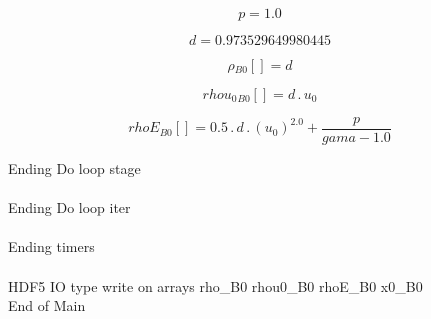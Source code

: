 \documentclass{article}
\begin{document}
\begin{dmath}p = 1.0\end{dmath}

\begin{dmath}d = 0.973529649980445\end{dmath}

\begin{dmath}{\rho{_{B0}}}[{}] = d\end{dmath}

\begin{dmath}{rhou_{0}{_{B0}}}[{}] = d \,.\, u_{0}\end{dmath}

\begin{dmath}{rhoE{_{B0}}}[{}] = 0.5 \,.\, d \,.\, \left(u_{0} \right)^{2.0} + \frac{p}{gama - 1.0}\end{dmath}

\noindent Ending Do loop stage\\
\\\noindent Ending Do loop iter\\
\\\noindent Ending timers\\
\\\noindent HDF5 IO type write on arrays rho_B0 rhou0_B0 rhoE_B0 x0_B0\\\noindent End of Main\\
\end{document}
